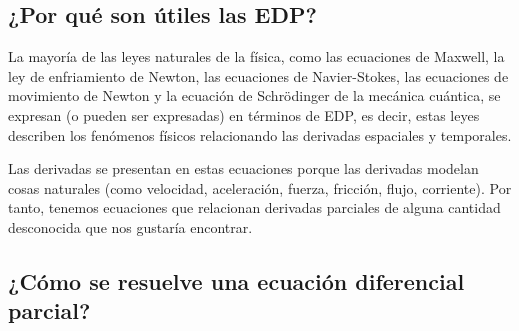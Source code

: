 \subsection*{¿Por qué son útiles las EDP?}

La mayoría de las leyes naturales de la física, como las ecuaciones de Maxwell, la ley de enfriamiento de Newton, las ecuaciones de Navier-Stokes, las ecuaciones de movimiento de Newton y la ecuación de Schrödinger de la mecánica cuántica, se expresan (o pueden ser expresadas) en términos de EDP, es decir, estas leyes describen los fenómenos físicos relacionando las derivadas espaciales y temporales.
\par
Las derivadas se presentan en estas ecuaciones porque las derivadas modelan cosas naturales (como velocidad, aceleración, fuerza, fricción, flujo, corriente). Por tanto, tenemos ecuaciones que relacionan derivadas parciales de alguna cantidad desconocida que nos gustaría encontrar.

\subsection{¿Cómo se resuelve una ecuación diferencial parcial?}

